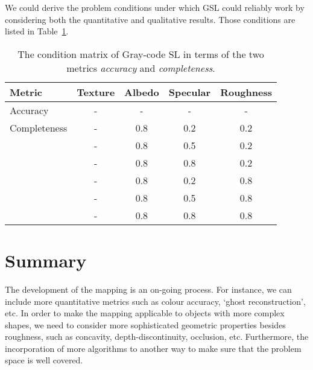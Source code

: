 We could derive the problem conditions under which GSL could reliably work by considering both the quantitative and qualitative results. Those conditions are listed in Table~\ref{tab:sl_training_result}.
\begin{table}[!htbp]
  \centering
  \begin{tabular}{l*{4}{c}}
  \hline
  \textbf{Metric} & Texture & Albedo & Specular & Roughness\\
  \hline
  Accuracy     & - & - & - & -\\
  \hline
  Completeness & - & 0.8 & 0.2 & 0.2\\
               & - & 0.8 & 0.5 & 0.2\\
               & - & 0.8 & 0.8 & 0.2\\
               & - & 0.8 & 0.2 & 0.8\\
               & - & 0.8 & 0.5 & 0.8\\
               & - & 0.8 & 0.8 & 0.8\\
  \hline
  \end{tabular}
  \caption{The condition matrix of Gray-code SL in terms of the two metrics \textit{accuracy} and \textit{completeness}.}
  \label{tab:sl_training_result}
\end{table}

\section{Summary}
The development of the mapping is an on-going process. For instance, we can include more quantitative metrics such as colour accuracy, `ghost reconstruction', etc. In order to make the mapping applicable to objects with more complex shapes, we need to consider more sophisticated geometric properties besides roughness, such as concavity, depth-discontinuity, occlusion, etc. Furthermore, the incorporation of more algorithms to another way to make sure that the problem space is well covered.


